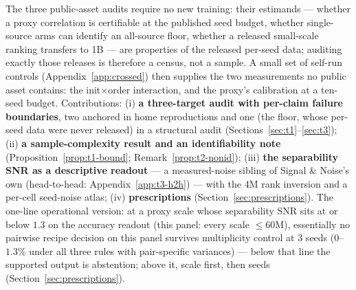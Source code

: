 The three public-asset audits require no new training: their estimands --- whether a proxy
correlation is certifiable at the published seed budget, whether single-source arms can
identify an all-source floor, whether a released small-scale ranking transfers to 1B --- are
properties of the released per-seed data; auditing exactly those releases is
therefore a census, not a sample. A small set of self-run controls
(Appendix~\ref{app:crossed}) then supplies the two measurements no public asset contains: the
init$\times$order interaction, and the proxy's calibration at a ten-seed budget.
Contributions: (i) \textbf{a three-target audit with per-claim failure boundaries}, two anchored in home reproductions and one (the floor, whose per-seed data were never released) in a structural audit (Sections~\ref{sec:t1}--\ref{sec:t3}); (ii)
\textbf{a sample-complexity result and an identifiability note}
(Proposition~\ref{prop:t1-bound}; Remark~\ref{prop:t2-nonid}); (iii) \textbf{the
separability SNR as a descriptive readout} --- a measured-noise sibling of Signal \&
Noise's own (head-to-head: Appendix~\ref{app:t3-h2h}) --- with the 4M rank inversion and a per-cell
seed-noise atlas; (iv)
\textbf{prescriptions} (Section~\ref{sec:prescriptions}). The one-line operational version: at a proxy
scale whose separability SNR sits at or below $1.3$ on the accuracy readout (this panel: every
scale ${\le}60$M), essentially no pairwise recipe
decision on this panel survives multiplicity control at 3 seeds ($0$--$1.3\%$ under all three
rules with pair-specific variances) --- below that line the supported output is abstention; above it, scale first, then seeds
(Section~\ref{sec:prescriptions}).
